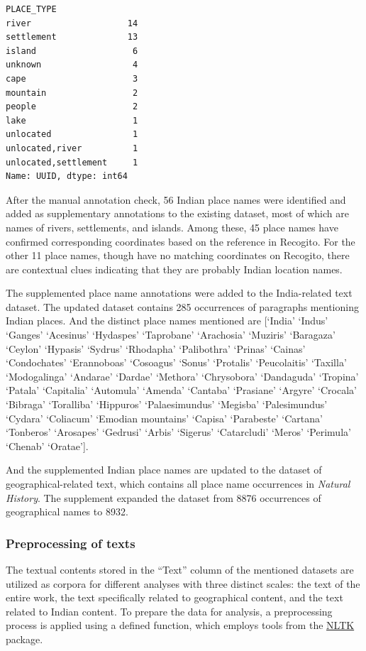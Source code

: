\documentclass[
  12pt,
]{article}
\begin{document}
\begin{verbatim}
PLACE_TYPE
river                   14
settlement              13
island                   6
unknown                  4
cape                     3
mountain                 2
people                   2
lake                     1
unlocated                1
unlocated,river          1
unlocated,settlement     1
Name: UUID, dtype: int64
\end{verbatim}

After the manual annotation check, 56 Indian place names were identified
and added as supplementary annotations to the existing dataset, most of
which are names of rivers, settlements, and islands. Among these, 45
place names have confirmed corresponding coordinates based on the
reference in Recogito. For the other 11 place names, though have no
matching coordinates on Recogito, there are contextual clues indicating
that they are probably Indian location names.

The supplemented place name annotations were added to the India-related
text dataset. The updated dataset contains 285 occurrences of paragraphs
mentioning Indian places. And the distinct place names mentioned are
{[}`India' `Indus' `Ganges' `Acesinus' `Hydaspes' `Taprobane'
`Arachosia' `Muziris' `Baragaza' `Ceylon' `Hypasis' `Sydrus' `Rhodapha'
`Palibothra' `Prinas' `Cainas' `Condochates' `Erannoboas' `Cosoagus'
`Sonus' `Protalis' `Peucolaitis' `Taxilla' `Modogalinga' `Andarae'
`Dardae' `Methora' `Chrysobora' `Dandaguda' `Tropina' `Patala'
`Capitalia' `Automula' `Amenda' `Cantaba' `Prasiane' `Argyre' `Crocala'
`Bibraga' `Toralliba' `Hippuros' `Palaesimundus' `Megisba'
`Palesimundus' `Cydara' `Coliacum' `Emodian mountains' `Capisa'
`Parabeste' `Cartana' `Tonberos' `Arosapes' `Gedrusi' `Arbis' `Sigerus'
`Catarcludi' `Meros' `Perimula' `Chenab' `Oratae'{]}.

And the supplemented Indian place names are updated to the dataset of
geographical-related text, which contains all place name occurrences in
\emph{Natural History}. The supplement expanded the dataset from 8876
occurrences of geographical names to 8932.

\hypertarget{preprocessing-of-texts}{%
\subsubsection{Preprocessing of texts}\label{preprocessing-of-texts}}

The textual contents stored in the ``Text'' column of the mentioned
datasets are utilized as corpora for different analyses with three
distinct scales: the text of the entire work, the text specifically
related to geographical content, and the text related to Indian content.
To prepare the data for analysis, a preprocessing process is applied
using a defined function, which employs tools from the
\href{https://www.nltk.org/}{NLTK} package.
\end{document}
